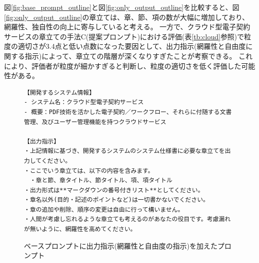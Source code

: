 図\ref{fig:base_prompt_outline}と図\ref{fig:only_output_outline}を比較すると、図\ref{fig:only_output_outline}の章立ては、章、節、項の数が大幅に増加しており、網羅性、独自性の向上に寄与していると考える。
一方で、クラウド型電子契約サービスの章立ての手法C(提案プロンプト)における評価(表\ref{tb:cloud}参照)で粒度の適切さが3.4点と低い点数になった要因として、出力指示(網羅性と自由度に関する指示)によって、章立ての階層が深くなりすぎたことが考察できる。
これにより、評価者が粒度が細かすぎると判断し、粒度の適切さを低く評価した可能性がある。

\begin{figure}[tp]
\begin{tcolorbox}[
  colback=white,
  colframe=blue,
  fonttitle=\bfseries
]
\footnotesize
\ttfamily
\fontsize{8}{9}\selectfont
\begin{verbatim}
【開発するシステム情報】
- システム名：クラウド型電子契約サービス
- 概要：PDF技術を活かした電子契約／ワークフロー、それらに付随する文書管理、及びユーザー管理機能を持つクラウドサービス

【出力指示】
・上記情報に基づき、開発するシステムのシステム仕様書に必要な章立てを出力してください。
・ここでいう章立ては、以下の内容を含みます。
　・章と節、章タイトル、節タイトル、項、項タイトル 
・出力形式は**マークダウンの番号付きリスト**としてください。 
・章名以外(目的・記述のポイントなど)は一切書かないでください。
・章の追加や削除、順序の変更は自由に行って構いません。
・人間が考慮し忘れるような章立ても考えるのがあなたの役目です。考慮漏れが無いように、網羅性を高めてください。
\end{verbatim}
\end{tcolorbox}
\caption{ベースプロンプトに出力指示(網羅性と自由度の指示)を加えたプロンプト}
\label{fig:only_output}
\end{figure}

